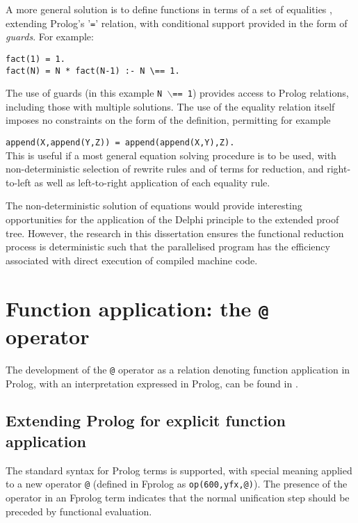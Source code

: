 \documentclass[a4paper,11pt,twoside]{article}
\begin{document}
A more general solution is to define functions in terms of a set of
equalities \cite{Han94, Nai91},
extending Prolog's '\texttt{=}' relation, with conditional
support provided in the form of \textit{guards}.  For example:

\begin{verbatim}
fact(1) = 1.
fact(N) = N * fact(N-1) :- N \== 1.
\end{verbatim}

The use of guards (in this example \texttt{N $\backslash$== 1})
provides access to Prolog relations, including those
with multiple solutions.  The use of the equality relation itself imposes
no constraints on the form of the definition, permitting for example

\texttt{append(X,append(Y,Z)) = append(append(X,Y),Z).}\\

This is useful if a most general equation solving procedure is to
be used, with non-deterministic selection of rewrite rules and
of terms for reduction, and right-to-left as well as left-to-right
application of each equality rule.

The non-deterministic solution of equations would provide interesting
opportunities for the application of the Delphi principle to the
extended proof tree.  However, the research in this dissertation
ensures the functional reduction process is deterministic such that
the parallelised program has the efficiency associated with
direct execution
of compiled machine code.

\section{Function application: the \texttt{@} operator} %
\label{application}
\enlargethispage{-2\baselineskip}  %

The development of the \texttt{@} operator as a relation denoting function
application in Prolog, with an interpretation expressed in Prolog, can be
found in \cite{Clo97}.

\subsection{Extending Prolog for explicit function application}

The standard syntax for Prolog terms is supported, with special meaning 
applied to a new operator \texttt{@} (defined in Fprolog as
\texttt{op(600,yfx,@)}).  The presence of the operator in an Fprolog
term indicates that the normal unification step should be preceded by
functional evaluation.
\end{document}
